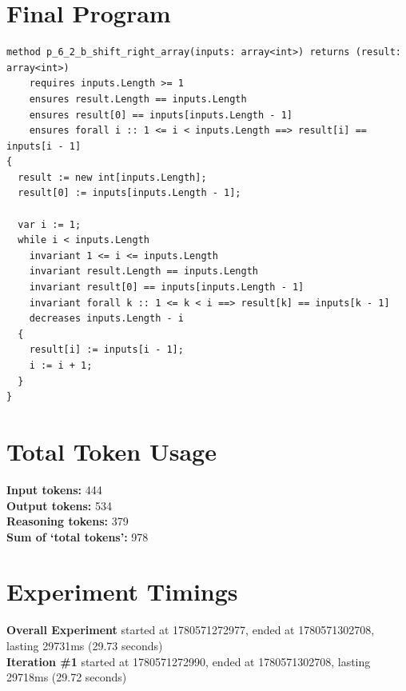 \documentclass{article}
\begin{document}
\section*{Final Program}
\begin{lstlisting}
method p_6_2_b_shift_right_array(inputs: array<int>) returns (result: array<int>)
	requires inputs.Length >= 1
	ensures result.Length == inputs.Length
	ensures result[0] == inputs[inputs.Length - 1]
	ensures forall i :: 1 <= i < inputs.Length ==> result[i] == inputs[i - 1]
{
  result := new int[inputs.Length];
  result[0] := inputs[inputs.Length - 1];

  var i := 1;
  while i < inputs.Length
    invariant 1 <= i <= inputs.Length
    invariant result.Length == inputs.Length
    invariant result[0] == inputs[inputs.Length - 1]
    invariant forall k :: 1 <= k < i ==> result[k] == inputs[k - 1]
    decreases inputs.Length - i
  {
    result[i] := inputs[i - 1];
    i := i + 1;
  }
}
\end{lstlisting}
\section*{Total Token Usage}
\textbf{Input tokens: }444
\\\textbf{Output tokens: }534
\\\textbf{Reasoning tokens: }379
\\\textbf{Sum of `total tokens': }978
\section*{Experiment Timings}
\textbf{Overall Experiment} started at 1780571272977, ended at 1780571302708, lasting 29731ms (29.73 seconds)
\\\textbf{Iteration \#1} started at 1780571272990, ended at 1780571302708, lasting 29718ms (29.72 seconds)
\end{document}
